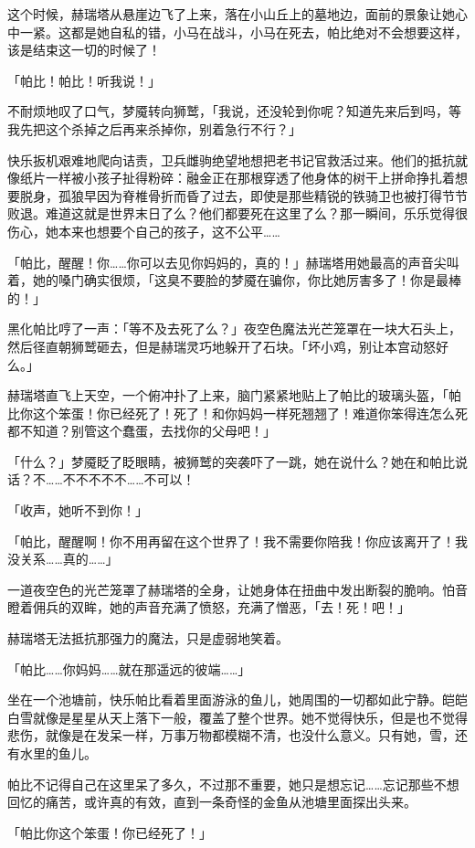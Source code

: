 这个时候，赫瑞塔从悬崖边飞了上来，落在小山丘上的墓地边，面前的景象让她心中一紧。这都是她自私的错，小马在战斗，小马在死去，帕比绝对不会想要这样，该是结束这一切的时候了！

「帕比！帕比！听我说！」

不耐烦地叹了口气，梦魇转向狮鹫，「我说，还没轮到你呢？知道先来后到吗，等我先把这个杀掉之后再来杀掉你，别着急行不行？」

快乐扳机艰难地爬向诘责，卫兵雌驹绝望地想把老书记官救活过来。他们的抵抗就像纸片一样被小孩子扯得粉碎：融金正在那根穿透了他身体的树干上拼命挣扎着想要脱身，孤狼早因为脊椎骨折而昏了过去，即使是那些精锐的铁骑卫也被打得节节败退。难道这就是世界末日了么？他们都要死在这里了么？那一瞬间，乐乐觉得很伤心，她本来也想要个自己的孩子，这不公平……{}

「帕比，醒醒！你……你可以去见你妈妈的，真的！」赫瑞塔用她最高的声音尖叫着，她的嗓门确实很烦，「这臭不要脸的梦魇在骗你，你比她厉害多了！你是最棒的！」

黑化帕比哼了一声：「等不及去死了么？」夜空色魔法光芒笼罩在一块大石头上，然后径直朝狮鹫砸去，但是赫瑞灵巧地躲开了石块。「坏小鸡，别让本宫动怒好么。」

赫瑞塔直飞上天空，一个俯冲扑了上来，脑门紧紧地贴上了帕比的玻璃头盔，「帕比你这个笨蛋！你已经死了！死了！和你妈妈一样死翘翘了！难道你笨得连怎么死都不知道？别管这个蠢蛋，去找你的父母吧！」

「什么？」梦魇眨了眨眼睛，被狮鹫的突袭吓了一跳，她在说什么？她在和帕比说话？不……不不不不不……不可以！

「收声，她听不到你！」

「帕比，醒醒啊！你不用再留在这个世界了！我不需要你陪我！你应该离开了！我没关系……真的……」

一道夜空色的光芒笼罩了赫瑞塔的全身，让她身体在扭曲中发出断裂的脆响。怕音瞪着佣兵的双眸，她的声音充满了愤怒，充满了憎恶，「去！死！吧！」

赫瑞塔无法抵抗那强力的魔法，只是虚弱地笑着。

「帕比……你妈妈……就在那遥远的彼端……」

\horizonline

坐在一个池塘前，快乐帕比看着里面游泳的鱼儿，她周围的一切都如此宁静。皑皑白雪就像是星星从天上落下一般，覆盖了整个世界。她不觉得快乐，但是也不觉得悲伤，就像是在发呆一样，万事万物都模糊不清，也没什么意义。只有她，雪，还有水里的鱼儿。

帕比不记得自己在这里呆了多久，不过那不重要，她只是想忘记……忘记那些不想回忆的痛苦，或许真的有效，直到一条奇怪的金鱼从池塘里面探出头来。

「帕比你这个笨蛋！你已经死了！」

